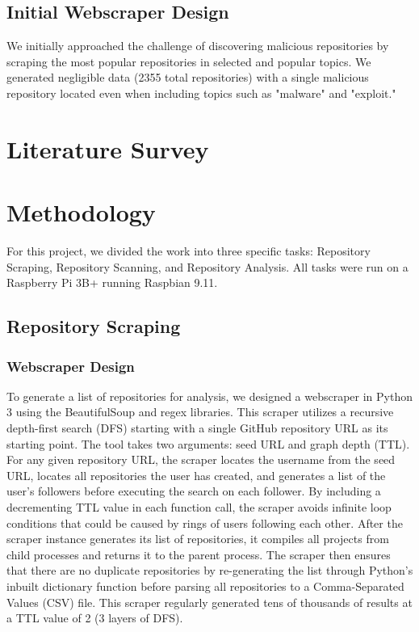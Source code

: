 \documentclass[]{acmart}
\begin{document}
\subsection{Initial Webscraper Design}
We initially approached the challenge of discovering malicious repositories by scraping the most popular repositories in selected and popular topics. We generated negligible data (2355 total repositories) with a single malicious repository located even when including topics such as "malware" and "exploit."
\section{Literature Survey}
\section{Methodology}
For this project, we divided the work into three specific tasks: Repository Scraping, Repository Scanning, and Repository Analysis. All tasks were run on a Raspberry Pi 3B+ running Raspbian 9.11.
\subsection{Repository Scraping}
\subsubsection{Webscraper Design}
To generate a list of repositories for analysis, we designed a webscraper in Python 3 using the BeautifulSoup and regex libraries. This scraper utilizes a recursive depth-first search (DFS) starting with a single GitHub repository URL as its starting point. The tool takes two arguments: seed URL and graph depth (TTL). For any given repository URL, the scraper locates the username from the seed URL, locates all repositories the user has created, and generates a list of the user's followers before executing the search on each follower. By including a decrementing TTL value in each function call, the scraper avoids infinite loop conditions that could be caused by rings of users following each other. After the scraper instance generates its list of repositories, it compiles all projects from child processes and returns it to the parent process. The scraper then ensures that there are no duplicate repositories by re-generating the list through Python's inbuilt dictionary function before parsing all repositories to a Comma-Separated Values (CSV) file. This scraper regularly generated tens of thousands of results at a TTL value of 2 (3 layers of DFS).
\end{document}

